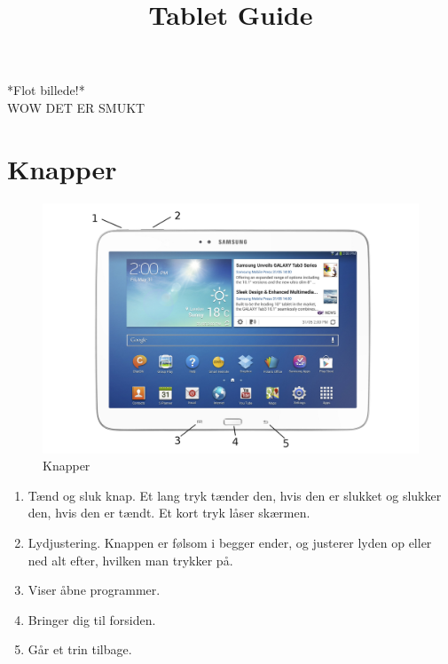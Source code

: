 \documentclass[12pt]{article}
\date{}
\title{Tablet Guide}
\begin{document}
\maketitle
\begin{center}
*Flot billede!*\\
WOW DET ER SMUKT
\end{center}


\newpage
\section{Knapper}
\begin{figure}[H]
  \centering
  \includegraphics[width=1.0\textwidth]{knapper.jpg}
  \caption{Knapper}
  \label{fig:knapper}
\end{figure}

\begin{enumerate}
    \item Tænd og sluk knap. Et lang tryk tænder den, hvis den er slukket og
        slukker den, hvis den er tændt. Et kort tryk låser skærmen.
    \item Lydjustering. Knappen er følsom i begger ender, og justerer lyden
        op eller ned alt efter, hvilken man trykker på.
    \item Viser åbne programmer. 
    \item Bringer dig til forsiden.
    \item Går et trin tilbage.
\end{enumerate}

\newpage
\end{document}
